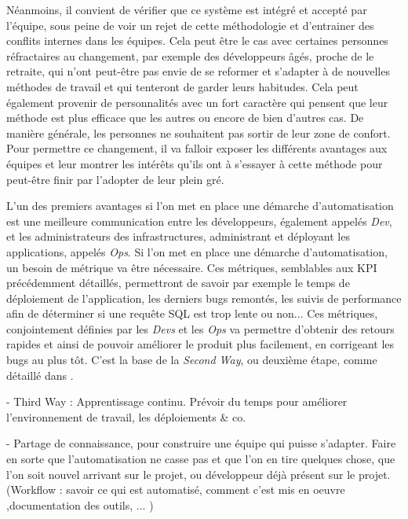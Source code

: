 Néanmoins, il convient de vérifier que ce système est intégré et accepté par l'équipe, sous peine de voir un rejet de cette méthodologie et d'entrainer des conflits internes dans les équipes. Cela peut être le cas avec certaines personnes réfractaires au changement, par exemple des développeurs âgés, proche de le retraite, qui n'ont peut-être pas envie de se reformer et s'adapter à de nouvelles méthodes de travail et qui tenteront de garder leurs habitudes. Cela peut également provenir de personnalités avec un fort caractère qui pensent que leur méthode est plus efficace que les autres ou encore de bien d'autres cas. De manière générale, les personnes ne souhaitent pas sortir de leur zone de confort. Pour permettre ce changement, il va falloir exposer les différents avantages aux équipes et leur montrer les intérêts qu'ils ont à s'essayer à cette méthode pour peut-être finir par l'adopter de leur plein gré. 

L'un des premiers avantages si l'on met en place une démarche d'automatisation est une meilleure communication entre les développeurs, également appelés \emph{Dev}, et les administrateurs des infrastructures, administrant et déployant les applications, appelés \emph{Ops}. Si l'on met en place une démarche d'automatisation, un besoin de métrique va être nécessaire. Ces métriques, semblables aux \gls{KPI} précédemment détaillés, permettront de savoir par exemple le temps de déploiement de l'application, les derniers bugs remontés, les suivis de performance afin de déterminer si une requête \gls{SQL} est trop lente ou non... Ces métriques, conjointement définies par les \emph{Devs} et les \emph{Ops} va permettre d'obtenir des retours rapides et ainsi de pouvoir améliorer le produit plus facilement, en corrigeant les bugs au plus tôt. C'est la base de la \emph{Second Way}, ou deuxième étape, comme détaillé dans  \cite{phoenixProject} .


- Third Way : Apprentissage continu. Prévoir du temps pour améliorer l'environnement de travail, les déploiements  \& co.

- Partage de connaissance, pour construire une équipe qui puisse s'adapter. Faire en sorte que l'automatisation ne casse pas et que l'on en tire quelques chose, que l'on soit nouvel arrivant sur le projet, ou développeur déjà présent sur le projet. (Workflow : savoir ce qui est automatisé, comment c'est mis en oeuvre ,documentation des outils, ... )

